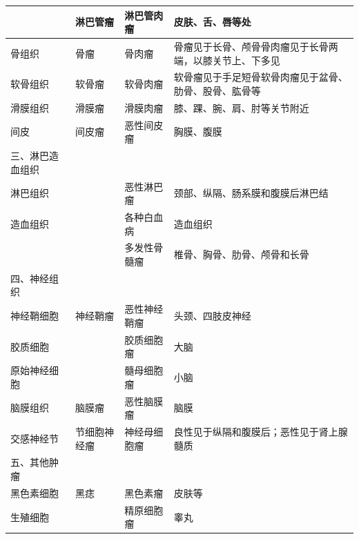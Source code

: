 \begin{longtable}[]{lm{3cm}m{3cm}m{3cm}}
                             & 淋巴管瘤             & 淋巴管肉瘤           & 皮肤、舌、唇等处
  \\\hline
  \quad 骨组织               & 骨瘤                 & 骨肉瘤               & 骨瘤见于长骨、颅骨骨肉瘤见于长骨两端，以膝关节上、下多见
  \\\hline
  \quad 软骨组织             & 软骨瘤               & 软骨肉瘤             & 软骨瘤见于手足短骨软骨肉瘤见于盆骨、肋骨、股骨、肱骨等
  \\\hline
  \quad 滑膜组织             & 滑膜瘤               & 滑膜肉瘤             & 膝、踝、腕、肩、肘等关节附近
  \\\hline
  \quad 间皮                 & 间皮瘤               & 恶性间皮瘤           & 胸膜、腹膜
  \\\hline
  三、淋巴造血组织           &                      &                      &
  \\\hline
  \quad 淋巴组织             &                      & 恶性淋巴瘤           & 颈部、纵隔、肠系膜和腹膜后淋巴结
  \\\hline
  \quad 造血组织             &                      & 各种白血病           & 造血组织
  \\\hline
                             &                      & 多发性骨髓瘤         & 椎骨、胸骨、肋骨、颅骨和长骨
  \\\hline
  四、神经组织               &                      &                      &
  \\\hline
  \quad 神经鞘细胞           & 神经鞘瘤             & 恶性神经鞘瘤         & 头颈、四肢皮神经
  \\\hline
  \quad 胶质细胞             &                      & 胶质细胞瘤           & 大脑
  \\\hline
  \quad 原始神经细胞         &                      & 髓母细胞瘤           & 小脑
  \\\hline
  \quad 脑膜组织             & 脑膜瘤               & 恶性脑膜瘤           & 脑膜
  \\\hline
  \quad 交感神经节           & 节细胞神经瘤         & 神经母细胞瘤         & 良性见于纵隔和腹膜后；恶性见于肾上腺髓质
  \\\hline
  五、其他肿瘤               &                      &                      &
  \\\hline
  \quad 黑色素细胞           & 黑痣                 & 黑色素瘤             & 皮肤等
  \\\hline
  \quad 生殖细胞             &                      & 精原细胞瘤           & 睾丸
  \\\hline

\end{longtable}
